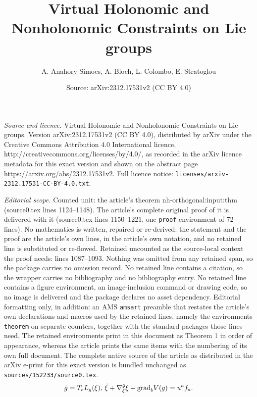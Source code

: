 \documentclass[10pt,a4paper]{amsart}
\title{Virtual Holonomic and Nonholonomic Constraints on Lie groups}
\author{A. Anahory Simoes, A. Bloch, L. Colombo, E. Stratoglou}
\date{Source: arXiv:2312.17531v2 (CC BY 4.0)}
\newcommand{\grad}{\normalfont{\text{grad}}}
\begin{document}
\maketitle

\noindent\emph{Source and licence.} Virtual Holonomic and Nonholonomic Constraints on Lie groups. Version arXiv:2312.17531v2 (CC BY 4.0), distributed by arXiv under the Creative Commons Attribution 4.0 International licence, http://creativecommons.org/licenses/by/4.0/, as recorded in the arXiv licence metadata for this exact version and shown on the abstract page https://arxiv.org/abs/2312.17531v2. Full licence notice: \texttt{licenses/arxiv-2312.17531-CC-BY-4.0.txt}.\par\smallskip

\noindent\textit{Editorial scope.} Counted unit: the article's theorem nh-orthogonal:input:thm (source0.tex lines 1124--1148). The article's complete original proof of it is delivered with it (source0.tex lines 1150--1221, one \texttt{proof} environment of 72 lines). No mathematics is written, repaired or re-derived: the statement and the proof are the article's own lines, in the article's own notation, and no retained line is substituted or re-flowed.  Retained uncounted as the source-local context the proof needs: lines 1087--1093.  Nothing was omitted from any retained span, so the package carries no omission record.  No retained line contains a citation, so the wrapper carries no bibliography and no bibliography entry.  No retained line contains a figure environment, an image-inclusion command or drawing code, so no image is delivered and the package declares no asset dependency.  Editorial formatting only, in addition: an AMS \texttt{amsart} preamble that restates the article's own declarations and macros used by the retained lines, namely the environments \texttt{theorem} on separate counters, together with the standard packages those lines need.  The retained environments print in this document as Theorem 1 in order of appearance, whereas the article prints the same items with the numbering of its own full document.  The complete native source of the article as distributed in the arXiv e-print for this exact version is bundled unchanged as \texttt{sources/152233/source0.tex}.
\begin{equation}\label{nh-control:system}
    \dot{g} = T_{e}L_{g}(\xi),\,
    \dot{\xi} 
    + \nabla^{\mathfrak{g}}_{\xi}\xi 
    + \grad_{b} V(g)
    = u^{a}f_{a}.
\end{equation}
\end{document}
